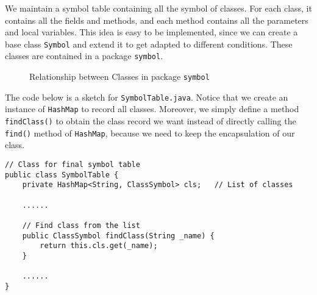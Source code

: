 \documentclass[letterpaper, 14pt]{article}
\begin{document}
We maintain a symbol table containing all the symbol of classes. For each class, 
it contains all the fields and methods, and each method contains all the parameters
and local variables. This idea is easy to be implemented, since we can create a base
class \texttt{Symbol} and extend it to get adapted to different conditions. These classes
are contained in a package \texttt{symbol}. 
\begin{figure}[H]
\centering
{}
\caption{Relationship between Classes in package \texttt{symbol}}
\end{figure}

The code below is a sketch for \texttt{SymbolTable.java}. Notice that we create an instance of \texttt{HashMap} to record all classes. Moreover, we simply define a method \texttt{findClass()} to obtain the class record we want instead of directly calling the \texttt{find()} method of \texttt{HashMap}, because we need to keep the encapsulation of our class. 
\begin{lstlisting}
// Class for final symbol table
public class SymbolTable {
	private HashMap<String, ClassSymbol> cls;	// List of classes
	
	......
	
	// Find class from the list
	public ClassSymbol findClass(String _name) {
		return this.cls.get(_name);
	}
	
	......
}
\end{lstlisting}
\end{document}
